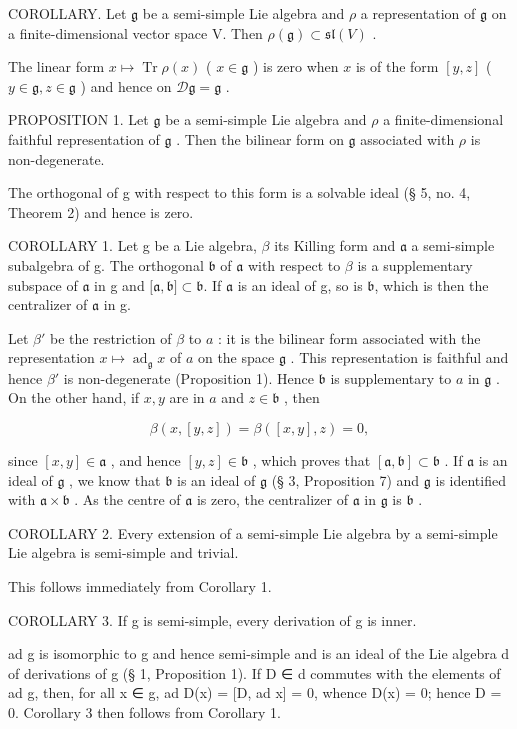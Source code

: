 COROLLARY. Let \(\mathfrak{g}\) be a semi-simple Lie algebra and \(\rho\) a representation of \(\mathfrak{g}\) on a finite-dimensional vector space V. Then \(\rho(\mathfrak{g}) \subset \mathfrak{sl}(V)\) .

The linear form \(x \mapsto \operatorname{Tr} \rho(x)\) ( \(x \in \mathfrak{g}\) ) is zero when \(x\) is of the form \([y, z]\) ( \(y \in \mathfrak{g}, z \in \mathfrak{g}\) ) and hence on \(\mathcal{D}\mathfrak{g} = \mathfrak{g}\) .

PROPOSITION 1. Let \(\mathfrak{g}\) be a semi-simple Lie algebra and \(\rho\) a finite-dimensional faithful representation of \(\mathfrak{g}\) . Then the bilinear form on \(\mathfrak{g}\) associated with \(\rho\) is non-degenerate.

The orthogonal of g with respect to this form is a solvable ideal (§ 5, no. 4, Theorem 2) and hence is zero.

COROLLARY 1. Let g be a Lie algebra, \(\beta\) its Killing form and \(\mathfrak{a}\) a semi-simple subalgebra of g. The orthogonal \(\mathfrak{b}\) of \(\mathfrak{a}\) with respect to \(\beta\) is a supplementary subspace of \(\mathfrak{a}\) in g and \({[}\mathfrak{a}, \mathfrak{b}{]} \subset \mathfrak{b}\). If \(\mathfrak{a}\) is an ideal of g, so is \(\mathfrak{b}\), which is then the centralizer of \(\mathfrak{a}\) in g.

Let \(\beta'\) be the restriction of \(\beta\) to \(a\) : it is the bilinear form associated with the representation \(x \mapsto \operatorname{ad}_{\mathfrak{g}} x\) of \(a\) on the space \(\mathfrak{g}\) . This representation is faithful and hence \(\beta'\) is non-degenerate (Proposition 1). Hence \(\mathfrak{b}\) is supplementary to \(a\) in \(\mathfrak{g}\) . On the other hand, if \(x, y\) are in \(a\) and \(z \in \mathfrak{b}\) , then

\[
\beta (x, [ y, z ]) = \beta ([ x, y ], z) = 0,
\]

 since \([x,y] \in \mathfrak{a}\) , and hence \([y,z] \in \mathfrak{b}\) , which proves that \([\mathfrak{a},\mathfrak{b}] \subset \mathfrak{b}\) . If \(\mathfrak{a}\) is an ideal of \(\mathfrak{g}\) , we know that \(\mathfrak{b}\) is an ideal of \(\mathfrak{g}\) (§ 3, Proposition 7) and \(\mathfrak{g}\) is identified with \(\mathfrak{a} \times \mathfrak{b}\) . As the centre of \(\mathfrak{a}\) is zero, the centralizer of \(\mathfrak{a}\) in \(\mathfrak{g}\) is \(\mathfrak{b}\) .

COROLLARY 2. Every extension of a semi-simple Lie algebra by a semi-simple Lie algebra is semi-simple and trivial.

This follows immediately from Corollary 1.

COROLLARY 3. If g is semi-simple, every derivation of g is inner.

ad g is isomorphic to g and hence semi-simple and is an ideal of the Lie algebra d of derivations of g (§ 1, Proposition 1). If D ∈ d commutes with the elements of ad g, then, for all x ∈ g, ad D(x) = {[}D, ad x{]} = 0, whence D(x) = 0; hence D = 0. Corollary 3 then follows from Corollary 1.
\relax{}
